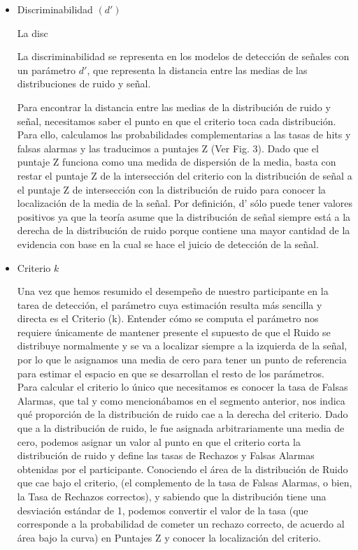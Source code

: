 \begin{itemize}
\item Discriminabilidad $(d')$

La disc

La discriminabilidad se representa en los modelos de detección de señales con un parámetro $d'$, que representa la distancia entre las medias de las distribuciones de ruido y señal. 

Para encontrar la distancia entre las medias de la distribución de ruido y señal, necesitamos saber el punto en que el criterio toca cada distribución. Para ello, calculamos las probabilidades complementarias a las tasas de hits y falsas alarmas y las traducimos a puntajes Z (Ver Fig. 3). Dado que el puntaje Z funciona como una medida de dispersión de la media, basta con restar el puntaje Z de la intersección del criterio con la distribución de señal a el puntaje Z de intersección con la distribución de ruido para conocer la localización de la media de la señal. Por definición, d’ sólo puede tener valores positivos ya que la teoría asume que la distribución de señal siempre está a la derecha de la distribución de ruido porque contiene una mayor cantidad de la evidencia con base en la cual se hace el juicio de detección de la señal.



\item Criterio  $k$

Una vez que hemos resumido el desempeño de nuestro participante en la tarea de detección, el parámetro cuya estimación resulta más sencilla y directa es el Criterio (k). Entender cómo se computa el parámetro nos requiere únicamente de mantener presente el supuesto de que el Ruido se distribuye normalmente y se va a localizar siempre a la izquierda de la señal, por lo que le asignamos una media de cero para tener un punto de referencia para estimar el espacio en que se desarrollan el resto de los parámetros. \\

Para calcular el criterio lo único que necesitamos es conocer la tasa de Falsas Alarmas, que tal y como mencionábamos en el segmento anterior, nos indica qué proporción de la distribución de ruido cae a la derecha del criterio. Dado que a la distribución de ruido, le fue asignada arbitrariamente una media de cero, podemos asignar un valor al punto en que el criterio corta la distribución de ruido y define las tasas de Rechazos y Falsas Alarmas obtenidas por el participante. Conociendo el área de la distribución de Ruido que cae bajo el criterio, (el complemento de la tasa de Falsas Alarmas, o bien, la Tasa de Rechazos correctos), y sabiendo que la distribución tiene una desviación estándar de 1, podemos convertir el valor de la tasa (que corresponde a la probabilidad de cometer un rechazo correcto, de acuerdo al área bajo la curva) en Puntajes Z y conocer la localización del criterio.\\


\end{itemize}
